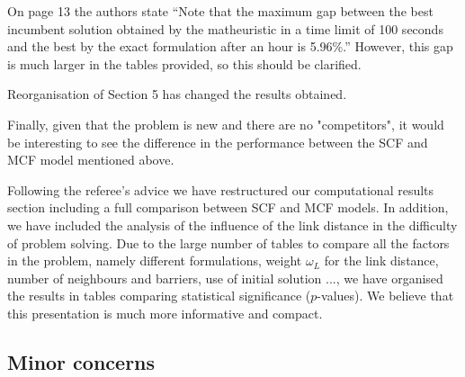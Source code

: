 \documentclass{article}
\newenvironment{reviewer}{\setcounter{pointcounter}{1}}{}
\newcommand{\point}{\text{{\selectfont \thepointcounter} \stepcounter{pointcounter}}}
\newcommand{\JP}[1]{{\color{black}#1}}
\begin{document}
\begin{reviewer}
		\begin{itshape}
			On page 13 the authors state ``Note that the maximum gap between the best incumbent solution obtained by the matheuristic in a time limit of 100 seconds and the best by the exact formulation after an hour is 5.96\%.'' However, this gap is much larger in the tables provided, so this should be clarified.
		\end{itshape}
  
		\begin{tcolorbox}[breakable,enhanced,coltitle=black,colback=green!5!white,colframe=green!75!black,title=\textbf{Answer R2.\point},borderline={1pt}{0pt}{black},boxrule=0pt]
            Reorganisation of Section 5 has changed the results obtained.
		\end{tcolorbox}
  
		\begin{itshape}
			Finally, given that the problem is new and there are no "competitors", it would be interesting to see the difference in the performance between the SCF and MCF model mentioned above.
		\end{itshape}
	
		\begin{tcolorbox}[breakable,enhanced,coltitle=black,colback=green!5!white,colframe=green!75!black,title=\textbf{Answer R2.\point},borderline={1pt}{0pt}{black},boxrule=0pt]
			\JP{
				Following the referee's advice we have  restructured our computational results section including a full comparison between SCF and MCF models. In addition, we have included the analysis of the influence of the link distance in the difficulty of problem solving. Due to the large number of tables to compare all the factors in the problem, namely different formulations, weight $\omega_L$ for the link distance, number of neighbours and barriers, use of initial solution ..., we have organised the results in tables comparing statistical significance ($p$-values). We believe that this presentation is much more informative and compact.}
		\end{tcolorbox}
	
		\subsection*{Minor concerns}
		

\end{reviewer}
\end{document}
